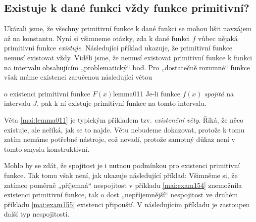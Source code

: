     \subsection{Existuje k dané funkci vždy funkce primitivní?}  
      Ukázali jsme, že všechny primitivní funkce k dané funkci se mohou lišit navzájem až na
      konstantu. Nyní si všimneme otázky, zda k dané funkci \(f\) vůbec nějaká primitivní funkce
      \emph{existuje}. Následující příklad ukazuje, že primitivní funkce nemusí existovat vždy.
      Viděli jsme, že nemusí existovat primitivní funkce k funkci na intervalu obsahujícím
      „problematický“ bod. Pro „dostatečně rozumné“ funkce však máme existenci zaručenou následující
      větou
      \begin{mathlemma}{o existenci primitivní funkce \(F(x)\)}{lemma011}         
        Je-li funkce \(f(x)\) \emph{spojitá} na intervalu \(J\), pak k ní existuje primitivní funkce
        na tomto intervalu.
      \end{mathlemma}
      Věta \eqref{mai:lemma011} je typickým příkladem tzv. \emph{existenční věty}. Říká, že něco
      existuje, ale neříká, jak se to najde. Větu nebudeme dokazovat, protože k tomu zatím nemáme
      potřebné nástroje, což nevadí, protože samotný důkaz není v tomto smyslu konstruktivní.
      
      Mohlo by se zdát, že spojitost je i nutnou podmínkou pro existenci primitivní funkce. Tak tomu
      však není, jak ukazuje následující příklad:
      Všimněme si, že zatímco poměrně „příjemná“ nespojitost v příkladu \eqref{mai:exam154}
      znemožnila existenci primitivní funkce, tak o dost „nepříjemnější“ nespojitost ve druhém
      příkladu \ref{mai:exam155} existenci připouští. V následujícím příkladu je zastoupen další
      typ nespojitosti.


